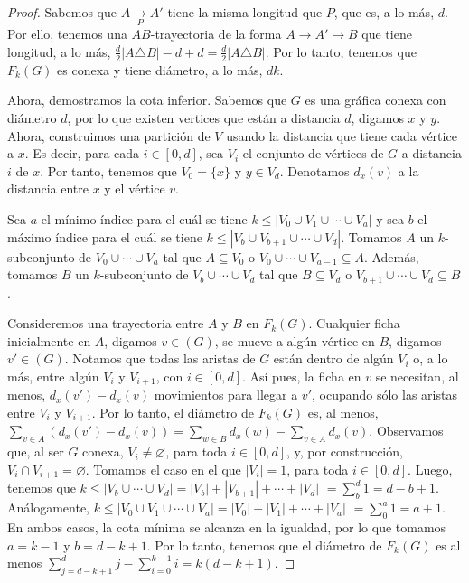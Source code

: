 \begin{proof}
    Sabemos que $A\xrightarrow[P]{} A'$ tiene la misma longitud que $P$, que es,
    a lo m\'as, $d$. Por ello, tenemos una $AB$-trayectoria de la forma
    $A\rightarrow A'\rightarrow B$ que tiene longitud, a lo m\'as,
    $\frac{d}{2}|A\triangle B|-d +d =\frac{d}{2}|A\triangle B|$. Por lo tanto,
    tenemos que $F_{k}(G)$ es conexa y tiene di\'ametro, a lo m\'as, $d k$.

    Ahora, demostramos la cota inferior. Sabemos que $G$ es una gr\'afica conexa
    con di\'ametro $d$, por lo que existen vertices que est\'an a distancia $d$,
    digamos $x$ y $y$. Ahora, construimos una partici\'on de $V$ usando la
    distancia que tiene cada v\'ertice a $x$. Es decir, para cada $i\in [0,d]$,
    sea $V_{i}$ el conjunto de v\'ertices de $G$ a distancia $i$ de $x$. Por
    tanto, tenemos que $V_{0}=\{x\}$ y $y\in V_{d}$. Denotamos $d_x(v)$ a la
    distancia entre $x$ y el v\'ertice $v$.

    Sea $a$ el m\'inimo \'indice para el cu\'al se tiene $k \leq |V_{0}\cup
    V_{1}\cup \cdots \cup V_{a}|$ y sea $b$ el m\'aximo \'indice para el cu\'al
    se tiene $k\leq |V_{b}\cup V_{b+1}\cup \cdots \cup V_{d}|$. Tomamos $A$ un
    $k$-subconjunto de $V_{0}\cup \cdots \cup V_{a}$  tal que $A\subseteq V_{0}$
    o $V_{0}\cup \cdots \cup V_{a-1}\subseteq A$. Adem\'as, tomamos $B$ un
    $k$-subconjunto de $V_{b}\cup \cdots \cup V_{d}$ tal que $B\subseteq V_{d}$
    o $V_{b+1}\cup \cdots \cup V_{d} \subseteq B$. 

    Consideremos una trayectoria entre $A$ y $B$ en $F_{k}(G)$. Cualquier ficha
    inicialmente en $A$, digamos $v \in (G)$, se mueve a alg\'un v\'ertice en
    $B$, digamos $v'\in (G)$. Notamos que todas las aristas de $G$ est\'an
    dentro de alg\'un $V_{i}$ o, a lo m\'as, entre alg\'un $V_{i}$ y $V_{i+1}$,
    con $i\in[0,d]$. As\'i pues, la ficha en $v$ se necesitan, al menos,
    $d_x(v')-d_x(v)$ movimientos para llegar a $v'$, ocupando s\'olo las aristas
    entre $V_{i}$ y $V_{i+1}$. Por lo tanto, el di\'ametro de $F_{k}(G)$ es, al
    menos, $\sum_{v\in A}(d_x(v')-d_x(v))= \sum_{w\in B}d_x(w)-\sum_{v\in
    A}d_x(v)$. Observamos que, al ser $G$ conexa, $V_{i} \neq \varnothing$, para
    toda $i\in [0,d]$, y, por construcci\'on, $V_{i} \cap V_{i+1}=\varnothing$.
    Tomamos el caso en el que $|V_{i}|=1$, para toda $i\in [0,d]$. Luego,
    tenemos que $k\leq |V_{b}\cup\cdots\cup V_{d}|=|V_{b}|+|V_{b+1}|+\cdots
    +|V_d|$ $=\sum_{b}^{d}1 = d -b+1$. An\'alogamente, $k\leq |V_{0}\cup
    V_{1}\cup \cdots \cup V_{a}|=|V_{0}|+|V_{1}|+\cdots + |V_{a}|$
    $=\sum_{0}^{a} 1 = a+1$. En ambos casos, la cota m\'inima se alcanza en la
    igualdad, por lo que tomamos $a=k-1$ y $b=d-k+1$. Por lo tanto, tenemos que
    el di\'ametro de $F_{k}(G)$ es al menos $\sum_{j=d -k+1}^{d}j -
    \sum_{i=0}^{k-1}i = k(d-k+1)$.
\end{proof}

